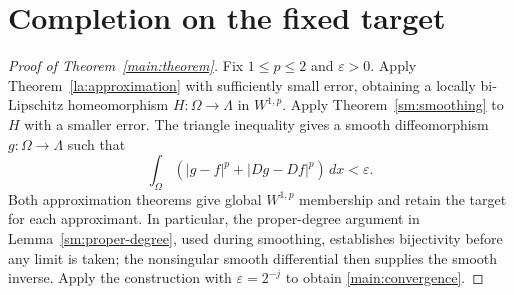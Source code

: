 \section{Completion on the fixed target}\label{sec:completion}

\begin{proof}[Proof of Theorem~\ref{main:theorem}]
Fix $1\le p\le2$ and $\varepsilon>0$. Apply Theorem~\ref{la:approximation} with sufficiently small error, obtaining a locally bi-Lipschitz homeomorphism $H:\Omega\to\Lambda$ in $W^{1,p}$. Apply Theorem~\ref{sm:smoothing} to $H$ with a smaller error. The triangle inequality gives a smooth diffeomorphism $g:\Omega\to\Lambda$ such that
\[
 \int_\Omega (|g-f|^p+|Dg-Df|^p)\,dx<\varepsilon.
\]
Both approximation theorems give global $W^{1,p}$ membership and retain
the target for each approximant. In particular, the proper-degree
argument in Lemma~\ref{sm:proper-degree}, used during smoothing,
establishes bijectivity before any limit is taken; the nonsingular
smooth differential then supplies the smooth inverse. Apply the
construction with $\varepsilon=2^{-j}$ to obtain
\eqref{main:convergence}.
\end{proof}
